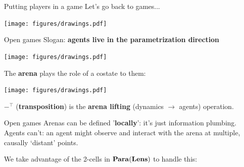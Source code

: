\begin{frame}{Putting players in a game}
	Let's go back to games...

	\vfill
	\begin{center}
		\texttt{[image: figures/drawings.pdf]}
	\end{center}


\end{frame}

\begin{frame}{Open games}
	Slogan: \textbf{agents live in the parametrization direction}

	\begin{center}
		\texttt{[image: figures/drawings.pdf]}
	\end{center}

	The \textbf{arena} plays the role of a costate to them:

	\begin{center}
		\texttt{[image: figures/drawings.pdf]}
	\end{center}

	$-^\top$ (\textbf{transposition}) is the \textbf{arena lifting} (dynamics $\to$ agents) operation.
\end{frame}

\begin{frame}{Open games}
	Arenas can be defined '\textbf{locally}': it's just information plumbing.
	Agents can't: an agent might observe and interact with the arena at multiple, causally `distant' points.

	We take advantage of the 2-cells in $\mathbf{Para}(\mathbf{Lens})$ to handle this:

	\begin{center}
	\end{center}
\end{frame}

